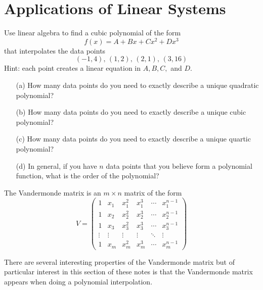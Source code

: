 \newpage\section{Applications of Linear Systems}
% 
\begin{problem}
    Use linear algebra to find a cubic polynomial of the form 
    \[ f(x) = A + Bx + Cx^2 + Dx^3 \]
    that interpolates the data points
    \[ (-1,4), \, (1,2), \, (2,1), \, (3,16) \]
    Hint: each point creates a linear equation in $A, B, C,$ and $D$.  
\end{problem}

\begin{problem}
    \begin{enumerate}
        \item[(a)] How many data points do you need to exactly describe a unique quadratic
            polynomial?
        \item[(b)] How many data points do you need to exactly describe a unique cubic
            polynomial?
        \item[(c)] How many data points do you need to exactly describe a unique quartic
            polynomial?
        \item[(d)] In general, if you have $n$ data points that you believe form a
            polynomial function, what is the order of the polynomial?
    \end{enumerate}
\end{problem}

\begin{definition}
    The Vandermonde matrix is an $m \times n$ matrix of the form
    \[ V = \begin{pmatrix} 1 & x_1 & x_1^2 & x_1^3 & \cdots & x_1^{n-1} \\
1 & x_2 & x_2^2 & x_2^3 & \cdots & x_2^{n-1} \\
1 & x_3 & x_3^2 & x_3^3 & \cdots & x_3^{n-1} \\
\vdots & \vdots & \vdots & \vdots & \ddots & \vdots \\
1 & x_m & x_m^2 & x_m^3 & \cdots & x_m^{n-1} \end{pmatrix} \]
\end{definition}
There are several interesting properties of the Vandermonde matrix but of particular
interest in this section of these notes is that the Vandermonde matrix appears when doing
a polynomial interpolation.  

